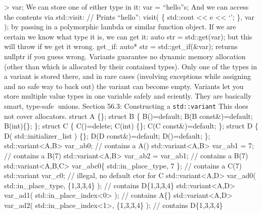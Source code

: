 \textgreater{} var; We can store one of either type in it: var =
``hello''s; And we can access the contents via std::visit: // Prints
``hello\n'': visit( \href{auto\&\&\%20e}{} \{ std::cout
\textless\textless{} e \textless\textless{} `\n'; \}, var ); by passing
in a polymorphic lambda or similar function object. If we are certain we
know what type it is, we can get it: auto str = std::get(var); but this
will throw if we get it wrong. get\_if: auto* str = std::get\_if(\&var);
returns nullptr if you guess wrong. Variants guarantee no dynamic memory
allocation (other than which is allocated by their contained types).
Only one of the types in a variant is stored there, and in rare cases
(involving exceptions while assigning and no safe way to back out) the
variant can become empty. Variants let you store multiple value types in
one variable safely and eciently. They are basically smart, type-safe
unions. Section 56.3: Constructing a
\passthrough{\lstinline!std::variant!} This does not cover allocators.
struct A \{\}; struct B \{ B()=default; B(B const\&)=default;
B(int)\{\}; \}; struct C \{ C()=delete; C(int) \{\}; C(C
const\&)=default; \}; struct D \{ D( std::initializer\_list ) \{\}; D(D
const\&)=default; D()=default; \};
std::variant\textless A,B\textgreater{} var\_ab0; // contains a A()
std::variant\textless A,B\textgreater{} var\_ab1 = 7; // contains a B(7)
std::variant\textless A,B\textgreater{} var\_ab2 = var\_ab1; // contains
a B(7) std::variant\textless A,B,C\textgreater{} var\_abc0\{
std::in\_place\_type, 7 \}; // contains a C(7) std::variant var\_c0; //
illegal, no default ctor for C std::variant\textless A,D\textgreater{}
var\_ad0( std::in\_place\_type, \{1,3,3,4\} ); // contains D\{1,3,3,4\}
std::variant\textless A,D\textgreater{} var\_ad1(
std::in\_place\_index\textless0\textgreater{} ); // contains A\{\}
std::variant\textless A,D\textgreater{} var\_ad2(
std::in\_place\_index\textless1\textgreater, \{1,3,3,4\} ); // contains
D\{1,3,3,4\}
